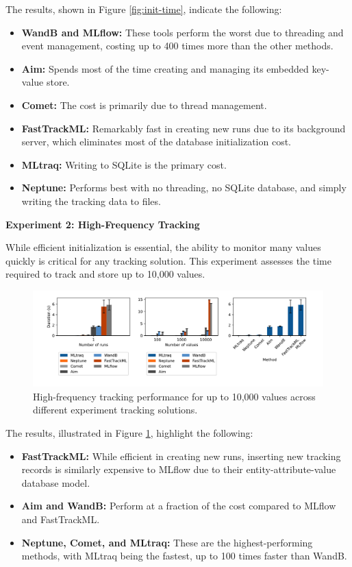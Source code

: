 The results, shown in Figure \ref{fig:init-time}, indicate the following:

\begin{itemize}
    \item \textbf{WandB and MLflow:} These tools perform the worst due to threading and event management, costing up to 400 times more than the other methods.
    \item \textbf{Aim:} Spends most of the time creating and managing its embedded key-value store.
    \item \textbf{Comet:} The cost is primarily due to thread management.
    \item \textbf{FastTrackML:} Remarkably fast in creating new runs due to its background server, which eliminates most of the database initialization cost.
    \item \textbf{MLtraq:} Writing to SQLite is the primary cost.
    \item \textbf{Neptune:} Performs best with no threading, no SQLite database, and simply writing the tracking data to files.\newline
\end{itemize}

\textbf{Experiment 2: High-Frequency Tracking}

While efficient initialization is essential, the ability to monitor many values quickly is critical for any tracking solution. This experiment assesses the time required to track and store up to 10,000 values.

\begin{figure}[h!]
    \centering
    \includegraphics[width=\textwidth]{images/mltraq/mltraq-high-frequency.png}
    \caption{High-frequency tracking performance for up to 10,000 values across different experiment tracking solutions.}
    \label{fig:high-freq}
\end{figure}

The results, illustrated in Figure \ref{fig:high-freq}, highlight the following:

\begin{itemize}
    \item \textbf{FastTrackML:} While efficient in creating new runs, inserting new tracking records is similarly expensive to MLflow due to their entity-attribute-value database model.
    \item \textbf{Aim and WandB:} Perform at a fraction of the cost compared to MLflow and FastTrackML.
    \item \textbf{Neptune, Comet, and MLtraq:} These are the highest-performing methods, with MLtraq being the fastest, up to 100 times faster than WandB.\newline
\end{itemize}

